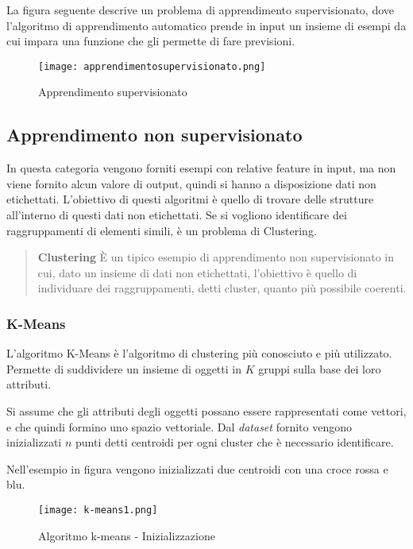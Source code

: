 \documentclass[../main.tex]{subfiles}
\begin{document}
La figura seguente descrive un problema di apprendimento supervisionato, dove l'algoritmo di apprendimento automatico prende in input un insieme di esempi da cui impara una funzione che gli permette di fare previsioni.

\begin{figure}[H]
				\centering
				\texttt{[image: apprendimentosupervisionato.png]}
				\caption{Apprendimento supervisionato}
\end{figure}

\subsection{Apprendimento non supervisionato}
In questa categoria vengono forniti esempi con relative feature in input, ma non viene fornito alcun valore di output, quindi si hanno a disposizione dati non etichettati. L'obiettivo di questi algoritmi è quello di trovare delle strutture all'interno di questi dati non etichettati. Se si vogliono identificare dei raggruppamenti di elementi simili, è un problema di Clustering.


\begin{verse}
				\textbf{Clustering} È un tipico esempio di apprendimento non supervisionato in cui, dato un insieme di dati non etichettati, l'obiettivo è quello di individuare dei raggruppamenti, detti cluster, quanto più possibile coerenti.
\end{verse}	

\subsubsection{K-Means}
L'algoritmo K-Means è l'algoritmo di clustering più conosciuto e più utilizzato. Permette di suddividere un insieme di oggetti in $K$ gruppi sulla base dei loro attributi.

Si assume che gli attributi degli oggetti possano essere rappresentati come vettori, e che quindi formino uno spazio vettoriale. Dal \textit{dataset} fornito vengono inizializzati $n$ punti detti centroidi per ogni cluster che è necessario identificare.

Nell'esempio in figura vengono inizializzati due centroidi con una croce rossa e blu.

\begin{figure}[H]
				\centering
				\texttt{[image: k-means1.png]}
				\caption{Algoritmo k-means - Inizializzazione}
\end{figure}
\end{document}
